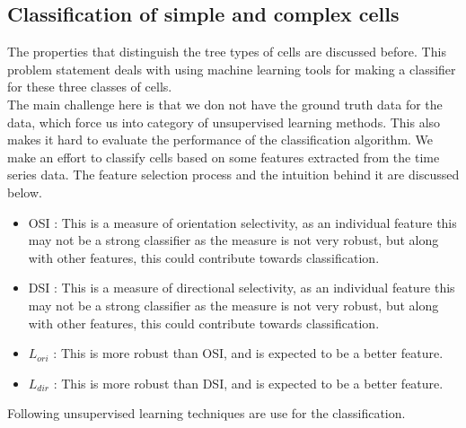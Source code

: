 \documentclass[11pt]{article}
\begin{document}
\subsection{Classification of simple and complex cells} %
\label{sub:classification_of_simple_and_complex_cells}
The properties that distinguish the tree types of cells are discussed before. This problem statement deals with using machine learning tools for making a classifier for these three classes of cells.\\
The main challenge here is that we don not have the ground truth data for the data, which force us into category of unsupervised learning methods. This also makes it hard to evaluate the performance of the classification algorithm. We make an effort to classify cells based on some features extracted from the time series data. The feature selection process and the intuition behind it are discussed below.
\begin{itemize}
    \item OSI : This is a measure of orientation selectivity, as an individual feature this may not be a strong classifier as the measure is not very robust, but along with other features, this could contribute towards classification.
    \item DSI : This is a measure of directional selectivity, as an individual feature this may not be a strong classifier as the measure is not very robust, but along with other features, this could contribute towards classification.
    \item $L_{ori}$ : This is more robust than OSI, and is expected to be a better feature.
    \item $L_{dir}$ : This is more robust than DSI, and is expected to be a better feature.
\end{itemize}
Following unsupervised learning techniques are use for the classification.
\end{document}
